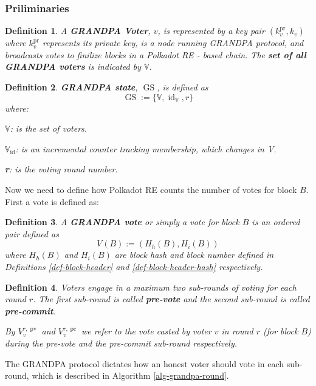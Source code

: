 \documentclass{article}
\newcommand{\assign}{:=}
\newcommand{\tmop}[1]{\ensuremath{\operatorname{#1}}}
\newcommand{\tmstrong}[1]{\textbf{#1}}
\newcommand{\tmtextbf}[1]{{\bfseries{#1}}}
\newtheorem{definition}{Definition}
\providecommand{\tmop}[1]{\ensuremath{\mathrm{#1}}}
\providecommand{\tmstrong}[1]{\tmtextbf{#1}}
\providecommand{\tmtextbf}[1]{\tmtextbf{#1}}
\newtheorem{definition}{Definition}
\begin{document}
\subsubsection{Priliminaries}

\begin{definition}
  A {\tmstrong{GRANDPA Voter}}, $v$, is represented by a key pair
  $(k^{\tmop{pr}}_v, k_v)$ where $k_v^{\tmop{pr}}$ represents its private key,
  is a node running GRANDPA protocol, and broadcasts votes to finilize blocks in
  a Polkadot RE - based chain. The {\tmstrong{set of all GRANDPA voters}} is
  indicated by $\mathbb{V}$.
\end{definition}

\begin{definition}
  {\tmstrong{GRANDPA state}}, $\tmop{GS}$, is defined as
  \[ \tmop{GS} \assign \{\mathbb{V}, \tmop{id}_{\mathbb{V}}, r\} \]
  where:
  
  $\mathbb{V}$: is the set of voters.
  
  {\tmstrong{$\mathbb{V}_{\tmop{id}}$}}: is an incremental counter tracking
  membership, which changes in V.
  
  {\tmstrong{r}}: is the voting round number.
\end{definition}

Now we need to define how Polkadot RE counts the number of votes for block $B$.
First a vote is defined as:

\begin{definition}
  \label{def-vote}A {\tmstrong{GRANDPA vote }}or simply a vote for block $B$
  is an ordered pair defined as
  \[ V_{} (B) \assign (H_h (B), H_i (B)) \]
  where $H_h (B)$ and $H_i (B)$ are block hash and block number defined in
  Definitions \ref{def-block-header} and \ref{def-block-header-hash}
  respectively.
\end{definition}

\begin{definition}
  Voters engage in a maximum two sub-rounds of voting for each round $r$. The
  first sub-round is called {\tmstrong{pre-vote}} and the second sub-round is
  called {\tmstrong{pre-commit}}.
  
  By {\tmstrong{$V_v^{r, \tmop{pv}}$}} and {\tmstrong{$V_v^{r, \tmop{pc}}$}}
  we refer to the vote casted by voter $v$ in round $r$ (for block $B$)
  during the pre-vote and the pre-commit sub-round respectively.
\end{definition}

The GRANDPA protocol dictates how an honest voter should vote in each
sub-round, which is described in Algorithm \ref{alg-grandpa-round}.
\end{document}
